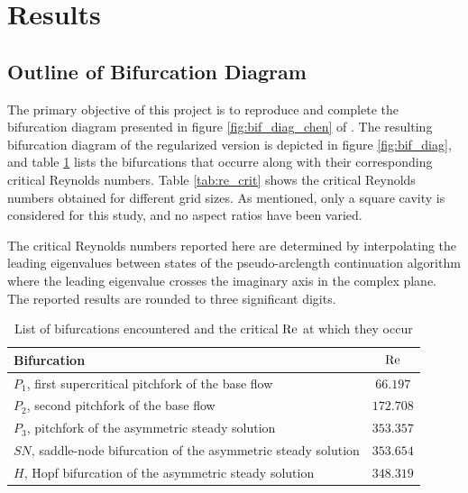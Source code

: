 
\section{Results } \label{sec:res}

\subsection{Outline of Bifurcation Diagram}

The primary objective of this project is to reproduce and complete the
bifurcation diagram presented in figure \ref{fig:bif_diag_chen} of
\citet{chen2013}. The resulting bifurcation diagram of the regularized version
is depicted in figure \ref{fig:bif_diag}, and table \ref{tab:bif_points} lists
the bifurcations that occurre along with their corresponding critical Reynolds
numbers. Table \ref{tab:re_crit} shows the critical Reynolds numbers obtained
for different grid sizes. As mentioned, only a square cavity is considered for
this study, and no aspect ratios have been varied.

The critical Reynolds numbers reported here are determined by interpolating the
leading eigenvalues between states of the pseudo-arclength continuation
algorithm where the leading eigenvalue crosses the imaginary axis in the
complex plane. The reported results are rounded to three significant digits.

\begin{table}[h!]
  \centering
  \caption{List of bifurcations encountered and the critical $\mathrm{Re}$ at which they
    occur}
  \label{tab:bif_points}
\begin{tabular}{l c}
Bifurcation & $\mathrm{Re}$\\
\hline
$P_1$, first supercritical pitchfork of the base flow & $66.197$ \\
$P_2$, second pitchfork of the base flow & $172.708$ \\
$P_3$, pitchfork of the asymmetric steady solution & $353.357$ \\
$SN$, saddle-node bifurcation of the asymmetric steady solution & $353.654$ \\
$H$, Hopf bifurcation of the asymmetric steady solution & $348.319$ \\
\end{tabular}
\end{table}

